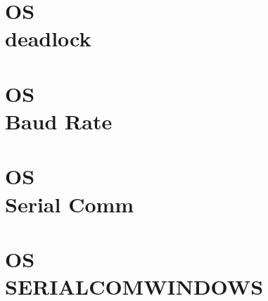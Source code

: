 \documentclass{wileySix}
\begin{document}
\chapter[DeadLock]
{OS\\ deadlock}



\chapter[Baudrate]
{OS\\ Baud Rate}


%

\chapter[Serial Communication di Linux]
{OS\\ Serial Comm}


\chapter[SERIALCOMWINDOWS]
{OS\\ SERIALCOMWINDOWS}


%

%

%

%
\end{document}
